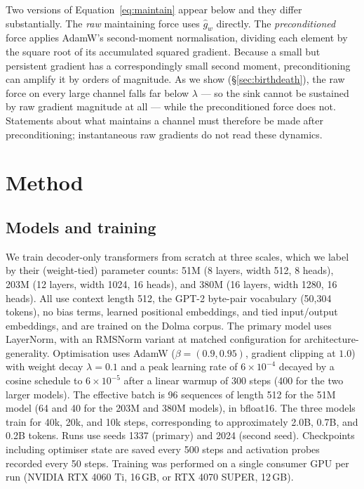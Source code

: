 \documentclass[11pt]{article}
\begin{document}
Two versions of Equation~\eqref{eq:maintain} appear below and they differ
substantially. The \emph{raw} maintaining force uses $\hat g_w$ directly. The
\emph{preconditioned} force applies AdamW's second-moment normalisation, dividing
each element by the square root of its accumulated squared gradient. Because a small
but persistent gradient has a correspondingly small second moment, preconditioning
can amplify it by orders of magnitude. As we show (\S\ref{sec:birthdeath}), the raw
force on every large channel falls far below $\lambda$ --- so the sink cannot be
sustained by raw gradient magnitude at all --- while the preconditioned force does
not. Statements about what maintains a channel must therefore be made after
preconditioning; instantaneous raw gradients do not read these dynamics.

\section{Method}\label{sec:method}

\subsection{Models and training}

We train decoder-only transformers from scratch at three scales, which we label by
their (weight-tied) parameter counts: 51M (8 layers, width 512, 8 heads), 203M
(12 layers, width 1024, 16 heads), and 380M (16 layers, width 1280, 16 heads). All
use context length 512, the GPT-2 byte-pair vocabulary (50{,}304 tokens), no bias
terms, learned positional embeddings, and tied input/output embeddings, and are
trained on the Dolma corpus. The primary model uses LayerNorm, with an RMSNorm
variant at matched configuration for architecture-generality. Optimisation uses
AdamW ($\beta=(0.9,0.95)$, gradient clipping at $1.0$) with weight decay
$\lambda=0.1$ and a peak learning rate of $6\times10^{-4}$ decayed by a cosine
schedule to $6\times10^{-5}$ after a linear warmup of 300 steps (400 for the two
larger models). The effective batch is 96 sequences of length 512 for the 51M model
(64 and 40 for the 203M and 380M models), in bfloat16. The three models train for
40k, 20k, and 10k steps, corresponding to approximately 2.0B, 0.7B, and 0.2B tokens.
Runs use seeds 1337 (primary) and 2024 (second seed). Checkpoints including optimiser
state are saved every 500 steps and activation probes recorded every 50 steps.
Training was performed on a single consumer GPU per run (NVIDIA RTX 4060 Ti, 16\,GB,
or RTX 4070 SUPER, 12\,GB).
\end{document}
